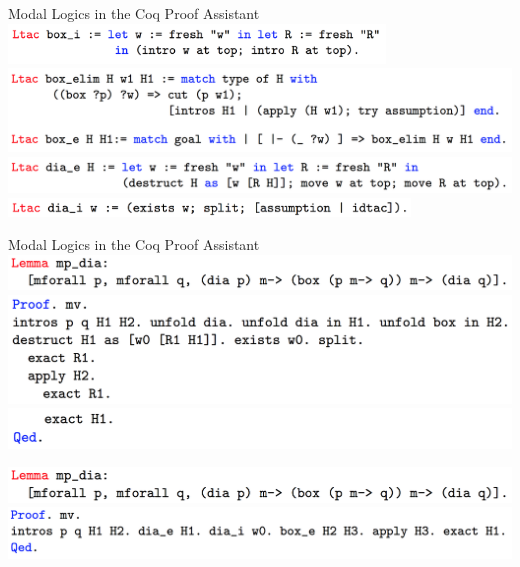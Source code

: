 \begin{frame}{Modal Logics in the Coq Proof Assistant}
\includegraphics[width=0.75\textwidth]{Images/CoqCode/6.png}\\
\includegraphics[width=\textwidth]{Images/CoqCode/7.png}\\
\includegraphics[width=\textwidth]{Images/CoqCode/8.png}\\
\includegraphics[width=0.8\textwidth]{Images/CoqCode/9.png}
\end{frame}

\begin{frame}{Modal Logics in the Coq Proof Assistant}
\includegraphics[width=\textwidth]{Images/CoqCode/10.png}\\
\includegraphics[width=\textwidth]{Images/CoqCode/11.png}\\
\includegraphics[width=\textwidth]{Images/CoqCode/12.png}

\bigskip

\includegraphics[width=\textwidth]{Images/CoqCode/10.png}\\
\includegraphics[width=\textwidth]{Images/CoqCode/13.png}
\end{frame}


